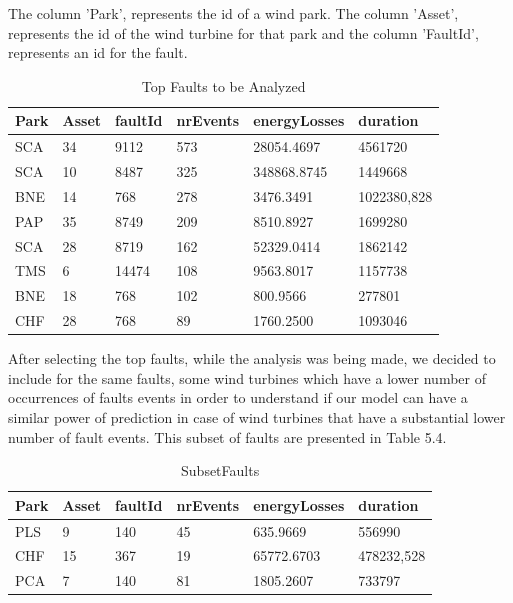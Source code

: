 The column 'Park', represents the id of a wind park. The column 'Asset', represents the id of the wind turbine for that park and the column 'FaultId', represents an id for the fault.

\begin{table}[!ht]
    \centering
    \begin{tabular}{|l|l|l|l|l|l|}
    \hline
        Park & Asset & faultId & nrEvents & energyLosses & duration \\ \hline
        SCA & 34 & 9112 & 573 & 28054.4697 & 4561720 \\ \hline
        SCA & 10 & 8487 & 325 & 348868.8745 & 1449668 \\ \hline
        BNE & 14 & 768 & 278 & 3476.3491 & 1022380,828 \\ \hline
        PAP & 35 & 8749 & 209 & 8510.8927 & 1699280 \\ \hline
        SCA & 28 & 8719 & 162 & 52329.0414 & 1862142 \\ \hline
        TMS & 6 & 14474 & 108 & 9563.8017 & 1157738 \\ \hline
        BNE & 18 & 768 & 102 & 800.9566 & 277801 \\ \hline
        CHF & 28 & 768 & 89 & 1760.2500 & 1093046 \\ \hline
    \end{tabular}
    \caption{Top Faults to be Analyzed}
    \label{TopFaultsTable}
\end{table}

After selecting the top faults, while the analysis was being made, we decided to include for the same faults, some wind turbines which have a lower number of occurrences of faults events in order to understand if our model can have a similar power of prediction in case of wind turbines that have a substantial lower number of fault events. This subset of faults are presented in Table 5.4.

\begin{table}[!ht]
    \centering
    \begin{tabular}{|l|l|l|l|l|l|}
    \hline
        Park & Asset & faultId & nrEvents & energyLosses & duration \\ \hline
        PLS & 9 & 140 & 45 & 635.9669 & 556990 \\ \hline
        CHF & 15 & 367 & 19 & 65772.6703 & 478232,528 \\ \hline
        PCA & 7 & 140 & 81 & 1805.2607 & 733797 \\ \hline
    \end{tabular}
    \caption{SubsetFaults}
    \label{Subset of Faults with less occurences that are going to be analyzed}
\end{table}

